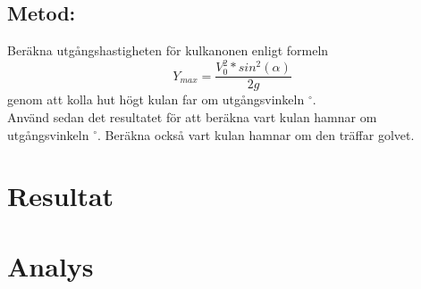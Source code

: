 \documentclass[11p]{article}
\begin{document}
    \subsection{Metod:}
    Beräkna utgångshastigheten för kulkanonen enligt formeln
    \begin{equation}
        Y_{max} = \frac{V_0^2*sin^2(\alpha)}{2g}
    \end{equation}
    genom att kolla hut högt kulan far om utgångsvinkeln \alpha {} $^{\circ}$. \\
    Använd sedan det resultatet för att beräkna vart kulan hamnar om utgångsvinkeln \alpha {} $^{\circ}$.
    Beräkna också vart kulan hamnar om den träffar golvet.
    \paragraph{}

    \section{Resultat}



    \section{Analys}
\end{document}
